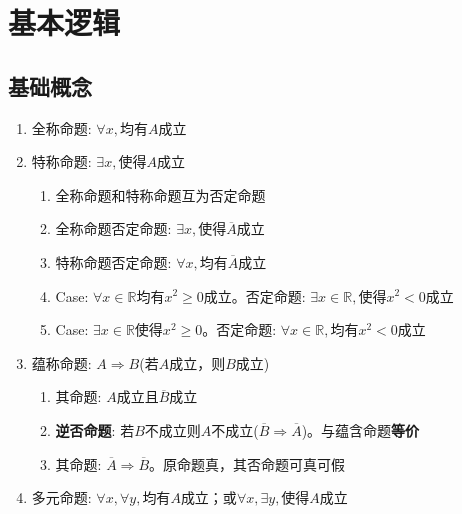 \documentclass[a4paper,12pt]{article}
\begin{document}



    \section{基本逻辑}

    \subsection{基础概念}

    \begin{enumerate}
        \item 全称命题: $\forall x,$均有$A$成立
        \item 特称命题: $\exists x,$使得$A$成立
        \begin{enumerate}
            \item 全称命题和特称命题互为否定命题
            \item 全称命题否定命题: $\exists x,$使得$\overline{A}$成立
            \item 特称命题否定命题: $\forall x,$均有$\overline{A}$成立
            \item Case: $\forall x \in \mathbb{R}$均有$x^2 \ge 0$成立。否定命题: $\exists x \in \mathbb{R},$使得$x^2 < 0$成立
            \item Case: $\exists x \in \mathbb{R}$使得$x^2 \ge 0$。否定命题: $\forall x \in \mathbb{R},$均有$x^2 < 0$成立
        \end{enumerate}
        \item 蕴称命题: $A \Rightarrow B$(若$A$成立，则$B$成立)
        \begin{enumerate}
            \item 其{\color{red}{否定}}命题: $A$成立且$\overline{B}$成立
            \item \textbf{逆否命题}: 若$B$不成立则$A$不成立($\overline{B} \Rightarrow \overline{A}$)。与蕴含命题\textbf{等价}
            \item 其{\color{red}{否}}命题: $\overline{A} \Rightarrow \overline{B}$。原命题真，其否命题可真可假
        \end{enumerate}
        \item 多元命题: $\forall x, \forall y,$均有$A$成立；或$\forall x, \exists y,$使得$A$成立

\end{enumerate}
\end{document}
